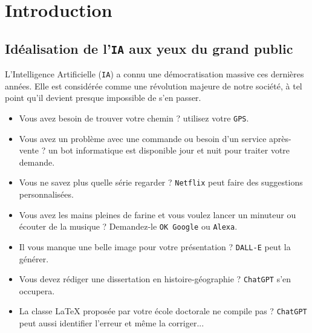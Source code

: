 \chapter{Introduction}
\label{chapter:1-INTRODUCTION}


	\section*{Idéalisation de l'\texttt{IA} aux yeux du grand public}
		
		L'Intelligence Artificielle (\texttt{IA}) a connu une démocratisation massive ces dernières années.
		Elle est considérée comme une révolution majeure de notre société, à tel point qu'il devient presque impossible de s'en passer.
		\begin{itemize}
			\item Vous avez besoin de trouver votre chemin ? utilisez votre \texttt{GPS}.
			\item Vous avez un problème avec une commande ou besoin d'un service après-vente ? un bot informatique est disponible jour et nuit pour traiter votre demande.
			\item Vous ne savez plus quelle série regarder ? \texttt{Netflix} peut faire des suggestions personnalisées.
			\item Vous avez les mains pleines de farine et vous voulez lancer un minuteur ou écouter de la musique ? Demandez-le \texttt{OK Google} ou \texttt{Alexa}.
			\item Il vous manque une belle image pour votre présentation ? \texttt{DALL-E} peut la générer.
			\item Vous devez rédiger une dissertation en histoire-géographie ? \texttt{ChatGPT} s'en occupera.
			\item La classe \LaTeX{} proposée par votre école doctorale ne compile pas ? \texttt{ChatGPT} peut aussi identifier l'erreur et même la corriger...
		\end{itemize}
		
